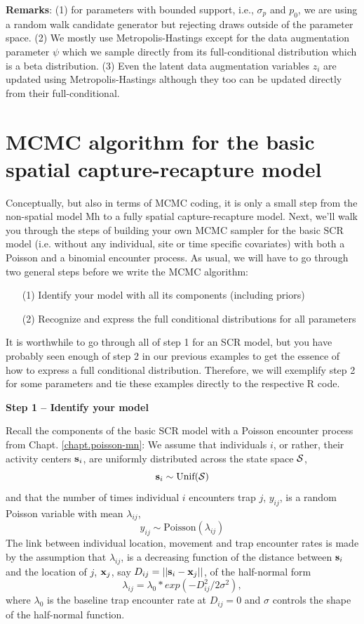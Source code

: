 {\bf Remarks}: (1) for parameters with bounded support, i.e.,
$\sigma_{p}$ and $p_{0}$, we are using a random walk candidate
generator but rejecting draws outside of the parameter space.  (2) We
mostly use Metropolis-Hastings except for the data augmentation
parameter $\psi$ which we sample directly from its full-conditional
distribution which is a beta distribution.  (3) Even the latent data
augmentation variables $z_{i}$ are updated using Metropolis-Hastings
although they too can be updated directly from their full-conditional.

\section{MCMC algorithm for the basic spatial capture-recapture model}

Conceptually, but also in terms of MCMC coding, it is only a small step from the non-spatial model Mh to a fully spatial capture-recapture model. Next, we'll walk you through the steps of building your own MCMC sampler for the basic SCR model (i.e. without any individual, site or time specific covariates) with both a Poisson and a binomial encounter process.
As usual, we will have to go through two general steps before we write the MCMC algorithm:
\begin{itemize}
\item[  (1)] Identify your model with all its components (including
    priors)
\item[  (2)] Recognize and express the full conditional distributions for
    all parameters
\end{itemize}
It is worthwhile to go through all of step 1 for an SCR model, but you
have probably seen enough of step 2 in our previous examples to get
the essence of how to express a full conditional
distribution. Therefore, we will exemplify step 2 for some parameters
and tie these examples directly to the respective R code.

{\bf Step 1 -- Identify your model}

Recall the components of the basic SCR model with a Poisson encounter process from Chapt. \ref{chapt.poisson-mn}:
We assume that individuals $i$, or rather, their activity centers
${\bf s}_i$, are uniformly distributed across the state space ${\cal S}$,
\[
{\bf s}_i  \sim \mbox{Unif}({\cal S})
\]
and that the number of times individual $i$ encounters trap $j$, $y_{ij}$, is a random Poisson variable with mean $\lambda_{ij}$,
\[
y_{ij} \sim \mbox{Poisson}(\lambda_{ij})
\]
The link between individual location, movement and trap encounter
rates is made by the assumption that $\lambda_{ij}$, is a decreasing
function of the distance between ${\bf s}_i$ and the location of $j$,
${\bf x}_{j}$, say $D_{ij} = ||{\bf s}_{i} - {\bf x}_{j}||$, of the half-normal form
\[
\lambda_{ij} =  \lambda_0 * exp(-D_{ij}^2/2\sigma^2),
\]
where $\lambda_0$ is the baseline trap encounter rate at $D_{ij}=0$ and $\sigma$ controls the shape of the half-normal function.

